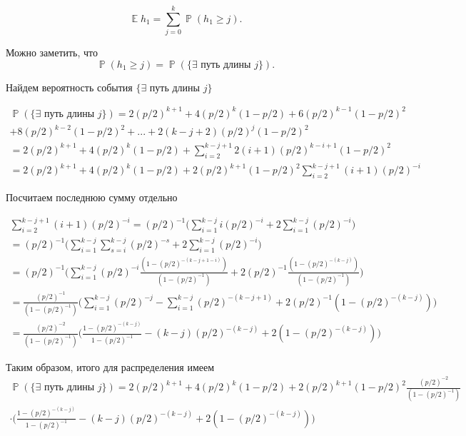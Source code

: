 \documentclass[10pt, reqno]{amsart}
\DeclareMathOperator*{\E}{\mathbb{E}}
\DeclareMathOperator*{\Pb}{\mathbb{P}}
\begin{document}
  \begin{equation*}
      \E h_{1} = \sum_{j=0}^{k}\Pb(h_{1} \geq j).
  \end{equation*}
  
  Можно заметить, что 
  \begin{equation*}
      \Pb(h_{1} \geq j) = \Pb(\{\exists \text{ путь длины } j\}).
  \end{equation*}
  
  Найдем вероятность события $\{\exists \text{ путь длины } j\}$
  
  \begin{align*}
     \Pb(\{\exists \text{ путь длины } j\}) = 2(p/2)^{k+1} + 4(p/2)^{k}(1-p/2) + 6(p/2)^{k-1}(1-p/2)^{2} \\ + 8(p/2)^{k-2}(1-p/2)^{2} + ... + 2(k-j+2)(p/2)^{j}(1-p/2)^{2} \\ = 2(p/2)^{k+1} + 4(p/2)^{k}(1-p/2) + \sum_{i=2}^{k-j+1}2(i+1)(p/2)^{k-i+1}(1-p/2)^{2} \\ = 2(p/2)^{k+1} + 4(p/2)^{k}(1-p/2) + 2(p/2)^{k+1}(1-p/2)^{2}\sum_{i=2}^{k-j+1}(i+1)(p/2)^{-i}
  \end{align*}
  
  Посчитаем последнюю сумму отдельно
  
  \begin{align*}
     \sum_{i=2}^{k-j+1}(i+1)(p/2)^{-i} = (p/2)^{-1}\Big(\sum_{i=1}^{k-j}i(p/2)^{-i} + 2\sum_{i=1}^{k-j}(p/2)^{-i}\Big) \\ = (p/2)^{-1}\Big(\sum_{i=1}^{k-j}\sum_{s=i}^{k-j}(p/2)^{-s} + 2\sum_{i=1}^{k-j}(p/2)^{-i}\Big) \\ = (p/2)^{-1}\Big(\sum_{i=1}^{k-j}(p/2)^{-i}\frac{(1-(p/2)^{-(k-j+1-i)})}{(1-(p/2)^{-1})} + 2(p/2)^{-1}\frac{(1-(p/2)^{-(k-j)})}{(1-(p/2)^{-1})}\Big) \\ = \frac{(p/2)^{-1}}{(1-(p/2)^{-1})}\Big(\sum_{i=1}^{k-j}(p/2)^{-j} - \sum_{i=1}^{k-j}(p/2)^{-(k-j+1)} + 2(p/2)^{-1}(1-(p/2)^{-(k-j)})\Big) \\ = \frac{(p/2)^{-2}}{(1-(p/2)^{-1})}\Big(\frac{1-(p/2)^{-(k-j)}}{1-(p/2)^{-1}} - (k-j)(p/2)^{-(k-j)} + 2(1-(p/2)^{-(k-j)})\Big)
  \end{align*}
  
  Таким образом, итого для распределения имеем
  \begin{align*}
      \Pb(\{\exists \text{ путь длины } j\}) = 2(p/2)^{k+1} + 4(p/2)^{k}(1-p/2) + 2(p/2)^{k+1}(1-p/2)^{2}\frac{(p/2)^{-2}}{(1-(p/2)^{-1})}\\\cdot\Big(\frac{1-(p/2)^{-(k-j)}}{1-(p/2)^{-1}} - (k-j)(p/2)^{-(k-j)} + 2(1-(p/2)^{-(k-j)})\Big)
  \end{align*}
  
\end{document}
